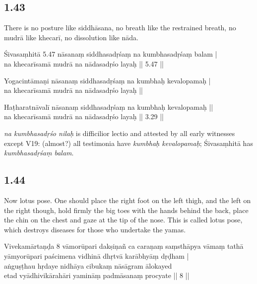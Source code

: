 \begin{ekdosis}
\subsection*{1.43}
\begin{translation}[hp01_043]
There is no posture like siddhāsana, no breath like the restrained breath, no mudrā like khecarī, no dissolution like nāda.
\end{translation}

\begin{sources}[hp01_043]
Śivasaṃhitā 5.47
\startverse
nāsanaṃ siddhasadṛśaṃ na kumbhasadṛśaṃ balam |\\
na khecarīsamā mudrā na nādasadṛśo layaḥ || 5.47 ||
\endverse
\end{sources}

\begin{testimonia}[hp01_043]
Yogacintāmaṇi
\startverse
nāsanaṃ siddhasadṛśaṃ na kumbhaḥ kevalopamaḥ |\\
na khecarīsamā mudrā na nādasadṛśo layaḥ ||
\endverse

Haṭharatnāvalī
\startverse
nāsanaṃ siddhasadṛśaṃ na kumbhaḥ kevalopamaḥ ||\\
na khecarīsamā mudrā na nādasadṛśo layaḥ || 3.29 ||
\endverse
\end{testimonia}

\begin{philcomm}[hp01_043]
\emph{na kumbhasadṛśo nilaḥ} is difficilior lectio and attested by all early witnesses except V19: (almost?) all testimonia have \emph{kumbhaḥ kevalopamaḥ}; Śivasaṃhitā has \emph{kumbhasadṛśaṃ balam}.
\end{philcomm}

\subsection*{1.44}
\begin{translation}[hp01_044]
Now lotus pose.
One should place the right foot on the left thigh, and the left on the right though, hold firmly the big toes with the hands behind the back, place the chin on the chest and gaze at the tip of the nose. This is called lotus pose, which destroys diseases for those who undertake the yamas.
\end{translation}

\begin{sources}[hp01_044]
Vivekamārtaṇḍa 8
\startverse
vāmorūpari dakṣiṇañ ca caraṇaṃ saṃsthāpya vāmaṃ tathā\\
yāmyorūpari paścimena vidhinā dhṛtvā karābhyāṃ dṛḍham |\\
aṅguṣṭhau hṛdaye nidhāya cibukaṃ nāsāgram ālokayed\\
etad vyādhivikārahāri yamināṃ padmāsanaṃ procyate || 8 ||
\endverse
\end{sources}


\end{ekdosis}
